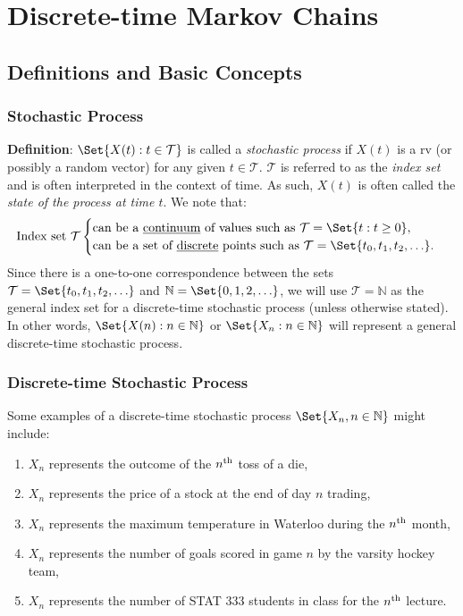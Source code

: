 \chapter{Discrete-time Markov Chains}
\section{Definitions and Basic Concepts}
\subsection*{Stochastic Process}
\begin{Regular}
    \textbf{Definition}: $ \Set{X(t)\given t\in\mathcal{T}} $ is called a \emph{stochastic process}
    if $ X(t) $ is a rv (or possibly a random vector) for any given $ t\in\mathcal{T} $.
    $ \mathcal{T} $ is referred to as the \emph{index set} and is often interpreted in
    the context of time. As such, $ X(t) $ is often called the \emph{state of the process at time $ t $}.
    We note that:
    \[ \text{Index set $ \mathcal{T} $}\begin{cases}
            \text{can be a \underline{continuum} of values such as $ \mathcal{T}=\Set{t\given t\ge 0} $}, \\
            \text{can be a set of \underline{discrete} points such as $ \mathcal{T}=\Set{t_0,t_1,t_2,\ldots} $}.
        \end{cases} \]
    Since there is a one-to-one correspondence between the sets $ \mathcal{T}=\Set{t_0,t_1,t_2,\ldots} $
    and $ \mathbb{N}=\Set{0,1,2,\ldots} $, we will use $ \mathcal{T}=\mathbb{N} $ as the general index set for a discrete-time
    stochastic process (unless otherwise stated). In other words, $ \Set{X(n)\given n\in\mathbb{N}} $ or $ \Set{X_n\given n\in\mathbb{N}} $
    will represent a general discrete-time stochastic process.
\end{Regular}
\subsection*{Discrete-time Stochastic Process}
Some examples of a discrete-time stochastic process $ \Set{X_n,n\in\mathbb{N}} $ might include:
\begin{enumerate}[(1)]
    \item $ X_n $ represents the outcome of the $n\textsuperscript{th}$ toss of a die,
    \item $ X_n $ represents the price of a stock at the end of day $n$ trading,
    \item $ X_n $ represents the maximum temperature in Waterloo during the $n\textsuperscript{th}$ month,
    \item $ X_n $ represents the number of goals scored in game $n$ by the varsity hockey team,
    \item $ X_n $ represents the number of STAT 333 students in class for the $n\textsuperscript{th}$ lecture.
\end{enumerate}
